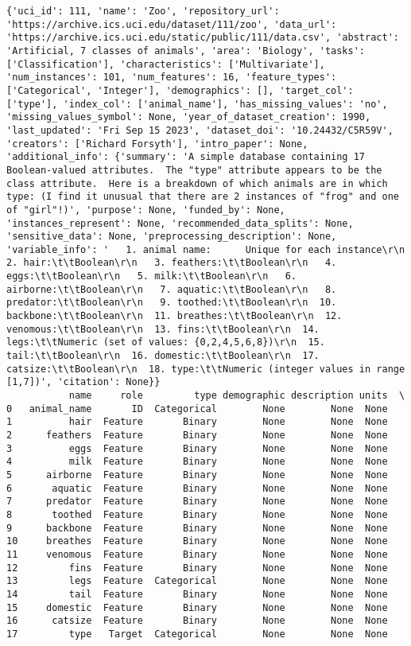 \documentclass[
  letterpaper,
]{krantz}
\begin{document}
\begin{verbatim}
{'uci_id': 111, 'name': 'Zoo', 'repository_url': 'https://archive.ics.uci.edu/dataset/111/zoo', 'data_url': 'https://archive.ics.uci.edu/static/public/111/data.csv', 'abstract': 'Artificial, 7 classes of animals', 'area': 'Biology', 'tasks': ['Classification'], 'characteristics': ['Multivariate'], 'num_instances': 101, 'num_features': 16, 'feature_types': ['Categorical', 'Integer'], 'demographics': [], 'target_col': ['type'], 'index_col': ['animal_name'], 'has_missing_values': 'no', 'missing_values_symbol': None, 'year_of_dataset_creation': 1990, 'last_updated': 'Fri Sep 15 2023', 'dataset_doi': '10.24432/C5R59V', 'creators': ['Richard Forsyth'], 'intro_paper': None, 'additional_info': {'summary': 'A simple database containing 17 Boolean-valued attributes.  The "type" attribute appears to be the class attribute.  Here is a breakdown of which animals are in which type: (I find it unusual that there are 2 instances of "frog" and one of "girl"!)', 'purpose': None, 'funded_by': None, 'instances_represent': None, 'recommended_data_splits': None, 'sensitive_data': None, 'preprocessing_description': None, 'variable_info': '   1. animal name:      Unique for each instance\r\n   2. hair:\t\tBoolean\r\n   3. feathers:\t\tBoolean\r\n   4. eggs:\t\tBoolean\r\n   5. milk:\t\tBoolean\r\n   6. airborne:\t\tBoolean\r\n   7. aquatic:\t\tBoolean\r\n   8. predator:\t\tBoolean\r\n   9. toothed:\t\tBoolean\r\n  10. backbone:\t\tBoolean\r\n  11. breathes:\t\tBoolean\r\n  12. venomous:\t\tBoolean\r\n  13. fins:\t\tBoolean\r\n  14. legs:\t\tNumeric (set of values: {0,2,4,5,6,8})\r\n  15. tail:\t\tBoolean\r\n  16. domestic:\t\tBoolean\r\n  17. catsize:\t\tBoolean\r\n  18. type:\t\tNumeric (integer values in range [1,7])', 'citation': None}}
           name     role         type demographic description units  \
0   animal_name       ID  Categorical        None        None  None   
1          hair  Feature       Binary        None        None  None   
2      feathers  Feature       Binary        None        None  None   
3          eggs  Feature       Binary        None        None  None   
4          milk  Feature       Binary        None        None  None   
5      airborne  Feature       Binary        None        None  None   
6       aquatic  Feature       Binary        None        None  None   
7      predator  Feature       Binary        None        None  None   
8       toothed  Feature       Binary        None        None  None   
9      backbone  Feature       Binary        None        None  None   
10     breathes  Feature       Binary        None        None  None   
11     venomous  Feature       Binary        None        None  None   
12         fins  Feature       Binary        None        None  None   
13         legs  Feature  Categorical        None        None  None   
14         tail  Feature       Binary        None        None  None   
15     domestic  Feature       Binary        None        None  None   
16      catsize  Feature       Binary        None        None  None   
17         type   Target  Categorical        None        None  None   


\end{verbatim}
\end{document}
